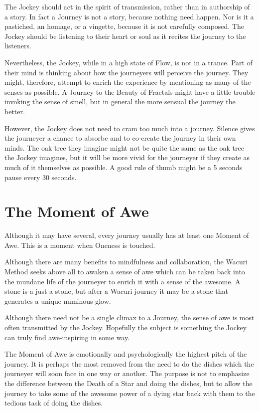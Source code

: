\documentclass[12pt]{book}
\begin{document}
The Jockey should act in the spirit of transmission, rather than in authorship of a story. In fact a Journey is not a story, because nothing need happen. Nor is it a pastiched, an homage, or a vingette, because it is not carefully composed.
The Jockey should be listening to their heart or soul as it recites the journey to the listeners.
					
Nevertheless, the Jockey, while in a high state of Flow, is not in a trance. Part of their mind is thinking about how the journeyers will perceive the journey. They might, therefore, attempt to enrich the experience by mentioning as many of the senses as possible. A Journey to the Beauty of Fractals might have a little trouble invoking the sense of smell, but in general the more sensual the journey the better.
					
However, the Jockey does not need to cram too much into a journey. Silence gives the journeyer a chance to absorbe and to co-create the journey in their own minds. The oak tree they imagine might not be quite the same as the oak tree the Jockey imagines, but it will be more vivid for the journeyer if they create as much of it themselves as possible. A good rule of thumb might be a 5 seconds pause every 30 seconds.
					
\section{The Moment of Awe}
					
Although it may have several, every journey usually has at least one Moment of Awe. This is a moment when Oneness is touched.
					
Although there are many benefits to mindfulness and collaboration, the Wacuri Method seeks above all to awaken a sense of awe which can be taken back into the mundane life of the journeyer to enrich it with a sense of the awesome. A stone is a just a stone, but after a Wacuri journey it may be a stone that generates a unique numinous glow.
					
Although there need not be a single climax to a Journey, the sense of awe is most often transmitted by the Jockey. Hopefully the subject is something the Jockey can truly find awe-inspiring in some way.
					
The Moment of Awe is emotionally and psychologically the highest pitch of the journey. It is perhaps the most removed from the need to do the dishes which the journeyer will soon face in one way or another. The purpose is not to emphasize the difference between the Death of a Star and doing the dishes, but to allow the journey to take some of the awesome power of a dying star back with them to the tedious task of doing the dishes.
					
\end{document}
